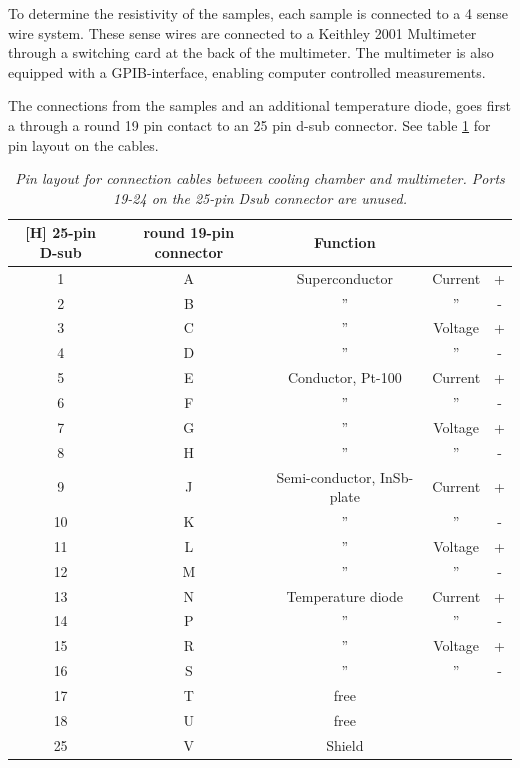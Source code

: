 \documentclass[a4paper,12pt]{article}
\begin{document}
To determine the resistivity of the samples, each sample is connected to a 4 sense wire system. These sense wires are connected to a Keithley 2001 Multimeter through a switching card at the back of the multimeter. The multimeter is also equipped with a GPIB-interface, enabling computer controlled measurements. 

The connections from the samples and an additional temperature diode, goes first a through a round 19 pin contact to an 25 pin d-sub connector. See table \ref{tab:PinNumbers} for pin layout on the cables.

\begin{table}
	
  \caption{\emph{Pin layout for connection cables between cooling chamber and multimeter. Ports 19-24 on the 25-pin Dsub connector are  unused.}} 
  
  \begin{tabular}{c|c|c c c}[H]
  \label{tab:PinNumbers}
  25-pin D-sub & round 19-pin connector & Function & & \\
  \hline
  1  & A & Superconductor    & Current & + \\
  2  & B & ''                & ''      & - \\
  3  & C & ''                & Voltage & + \\
  4  & D & ''                & ''      & - \\
  5  & E & Conductor, Pt-100            & Current & + \\
  6  & F & ''                & ''      & - \\
  7  & G & ''                & Voltage & + \\
  8  & H & ''                & ''      & - \\
  9  & J & Semi-conductor, InSb-plate        & Current & + \\
  10 & K & ''                & ''      & - \\
  11 & L & ''                & Voltage & + \\
  12 & M & ''                & ''      & - \\
  13 & N & Temperature diode & Current & + \\
  14 & P & ''                & ''      & - \\
  15 & R & ''                & Voltage & + \\
  16 & S & ''                & ''      & - \\   
  17 & T & free              &         &  \\
  18 & U & free              &         &  \\
  25 & V & Shield            &         &  \\ 
  \end{tabular}
  
\end{table} 
\end{document}
